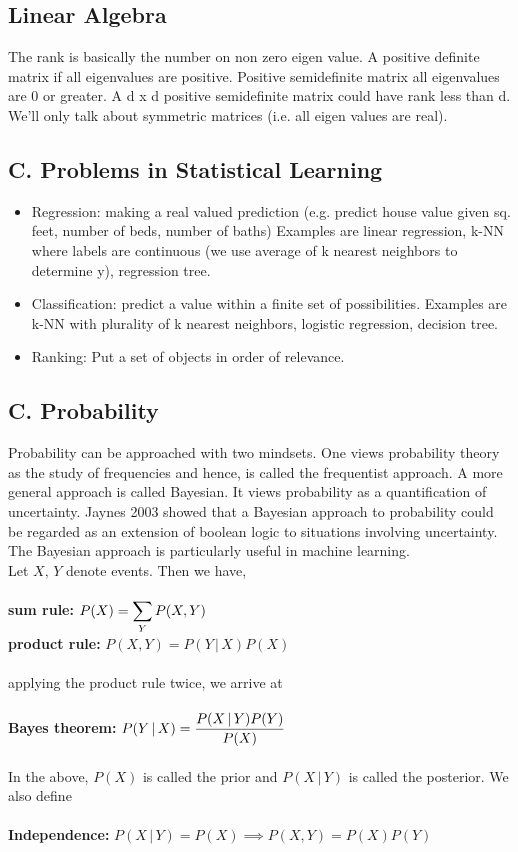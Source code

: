 \documentclass[10pt]{article}
\begin{document}
		\subsection*{Linear Algebra}
			The rank is basically the number on non zero eigen value. A positive definite matrix if all eigenvalues are
			positive. Positive semidefinite matrix all eigenvalues are 0 or greater. A d x d positive semidefinite matrix
			could have rank less than d. We'll only talk about symmetric matrices (i.e. all eigen values are real). 	
		\subsection*{C. Problems in Statistical Learning}
			\begin{itemize}
				\item Regression: making a real valued prediction (e.g. predict house value given sq. feet, 
					number of beds, number of baths) Examples are linear regression, k-NN where labels 
					are continuous (we use average of k nearest neighbors to determine y), regression tree. 
				\item Classification: predict a value within a finite set of possibilities. Examples are k-NN with 
					plurality of k nearest neighbors, logistic regression, decision tree. 
				\item Ranking: Put a set of objects in order of relevance. 
			\end{itemize}
		\subsection*{C. Probability}
			Probability can be approached with two mindsets. One views probability theory as the study of 
			frequencies and hence, is called the frequentist approach. A more general approach is called 
			Bayesian. It views probability as a quantification of uncertainty. Jaynes 2003 showed that 
			a Bayesian approach to probability could be regarded as an extension of boolean logic to
			situations involving uncertainty. The Bayesian approach is particularly useful in machine 
			learning. \\
			
			\noindent Let $X, \, Y$ denote events. Then we have, \\ \\
			\indent \indent \textbf{ sum rule:} \indent $\mathlarger{ P(X) = \sum_Y P(X,Y) }$ \\
			\indent \textbf{product rule: } $ P(X,Y) = P(Y \, | \, X)P(X) $ \\ \\
			\noindent applying the product rule twice, we arrive at \\ \\
			\indent \textbf{Bayes theorem:} $\mathlarger {P(Y \, | \, X) = \frac{P(X \, | \, Y)P(Y)}{P(X)}}$ \\ \\
			\noindent In the above, $P(X)$ is called the prior and $P(X \, | \, Y)$ is called the posterior. 
			\noindent We also define \\ \\
			 \textbf{Independence: } $P(X \, | \, Y) = P(X) \implies P(X,Y) = P(X)P(Y)$ \\
			
\end{document}
